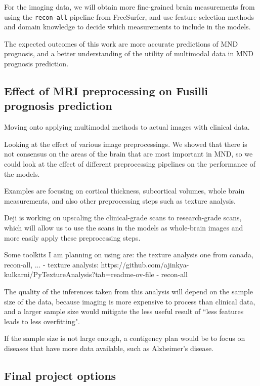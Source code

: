 For the imaging data, we will obtain more fine-grained brain measurements from using the \texttt{recon-all} pipeline from FreeSurfer, and use feature selection methods and domain knowledge to decide which measurements to include in the models.

The expected outcomes of this work are more accurate predictions of MND prognosis, and a better understanding of the utility of multimodal data in MND prognosis prediction.

\subsection{Effect of MRI preprocessing on Fusilli prognosis prediction}


Moving onto applying multimodal methods to actual images with clinical data.

Looking at the effect of various image preprocessings.
We showed that there is not consensus on the areas of the brain that are most important in MND, so we could look at the effect of different preprocessing pipelines on the performance of the models.

Examples are focusing on cortical thickness, subcortical volumes, whole brain measurements, and also other preprocessing steps such as texture analysis.

Deji is working on upscaling the clinical-grade scans to research-grade scans, which will allow us to use the scans in the models as whole-brain images and more easily apply these preprocessing steps.

Some toolkits I am planning on using are: the texture analysis one from canada, recon-all, ...
- texture analysis: https://github.com/ajinkya-kulkarni/PyTextureAnalysis?tab=readme-ov-file
- recon-all


The quality of the inferences taken from this analysis will depend on the sample size of the data, because imaging is more expensive to process than clinical data, and a larger sample size would mitigate the less useful result of ``less features leads to less overfitting".

If the sample size is not large enough, a contigency plan would be to focus on diseases that have more data available, such as Alzheimer's disease.

\subsection{Final project options}

